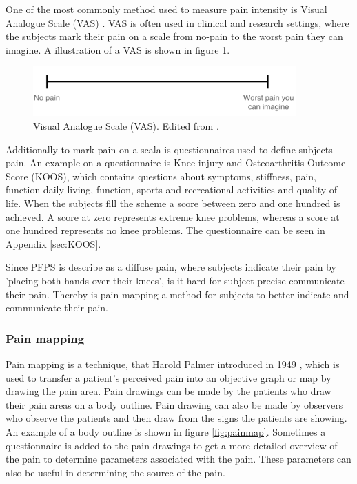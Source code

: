 \noindent
One of the most commonly method used to measure pain intensity is Visual Analogue Scale (VAS) \citep{Valente2011}. VAS is often used in clinical and research settings, where the subjects mark their pain on a scale from no-pain to the worst pain they can imagine.\citep{Haefeli2005} A illustration of a VAS is shown in figure \ref{fig:VAS}.

\begin{figure} [H]
\centering
\includegraphics[width=0.9\textwidth]{figures/VAS}
\caption{Visual Analogue Scale (VAS). Edited from \citep{Haefeli2005}.}
\label{fig:VAS}
\end{figure}

\noindent
Additionally to mark pain on a scala is questionnaires used to define subjects pain. An example on a questionnaire is Knee injury and Osteoarthritis Outcome Score (KOOS), which contains questions about symptoms, stiffness, pain, function daily living, function, sports and recreational activities and quality of life. When the subjects fill the scheme a score between zero and one hundred is achieved. A score at zero represents extreme knee problems, whereas a score at one hundred represents no knee problems.\citep{Roos2003} The questionnaire can be seen in Appendix \ref{sec:KOOS}. 

Since PFPS is describe as a diffuse pain, where subjects indicate their pain by 'placing both hands over their knees', is it hard for subject precise communicate their pain. Thereby is pain mapping a method for subjects to better indicate and communicate their pain. 

\subsubsection{Pain mapping}
Pain mapping is a technique, that Harold Palmer introduced in 1949 \citep{Grunnesjo2006}, which is used to transfer a patient’s perceived pain into an objective graph or map by drawing the pain area. Pain drawings can be made by the patients who draw their pain areas on a body outline. Pain drawing can also be made by observers who observe the patients and then draw from the signs the patients are showing. An example of a body outline is shown in figure \ref{fig:painmap}. Sometimes a questionnaire is added to the pain drawings to get a more detailed overview of the pain to determine parameters associated with the pain. These parameters can also be useful in determining the source of the pain.\citep{Schott2010}

